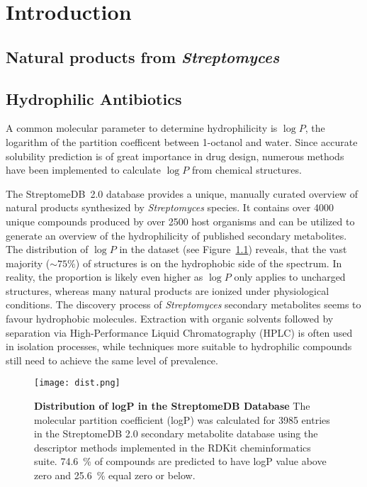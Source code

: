 \chapter{Introduction}

\section{Natural products from \textit{Streptomyces}} %
\label{sec:natural_products_from_it}


\section{Hydrophilic Antibiotics} %
\label{sec:hydrophilic_antibiotics}

A common molecular parameter to determine hydrophilicity is $\log P$, the logarithm of the partition coefficent between 1-octanol and water\autocite{Leo1971}.
Since accurate solubility prediction is of great importance in drug design, numerous methods have been implemented to calculate $\log P$ from chemical structures.\autocite{Eros2002,VandeWaterbeemd1996,Mannhold2009}

The StreptomeDB~2.0 database provides a unique, manually curated overview of natural products synthesized by \emph{Streptomyces} species.\autocite{Klementz2016}
It contains over 4000 unique compounds produced by over 2500 host organisms and can be utilized to generate an overview of the hydrophilicity of published secondary metabolites.
The distribution of $\log P$ in the dataset (see Figure~\ref{fig:logp_dist}) reveals, that the vast majority ($\sim 75\%$) of structures is on the hydrophobic side of the spectrum.
In reality, the proportion is likely even higher as $\log P$ only applies to uncharged structures, whereas many natural products are ionized under physiological conditions.
The discovery process of \emph{Streptomyces} secondary metabolites seems to favour hydrophobic molecules.
Extraction with organic solvents followed by separation via High-Performance Liquid Chromatography (HPLC) is often used in isolation processes, while techniques more suitable to hydrophilic compounds still need to achieve the same level of prevalence.\autocite{Sticher2008}

\begin{figure}[htbp]
	\centering
	\texttt{[image: dist.png]}
	\caption[Distribution of logP in the StreptomeDB Database]{%
		\textbf{Distribution of logP in the StreptomeDB Database}
		The molecular partition coefficient (logP) was calculated for 3985 entries in the StreptomeDB 2.0 secondary metabolite database\autocite{Klementz2016} using the descriptor methods implemented in the RDKit cheminformatics suite\autocite{Wildman1999}.
		74.6~\%  of compounds are predicted to have logP value above zero and 25.6~\% equal zero or below.
	}
	\label{fig:logp_dist}
\end{figure}



